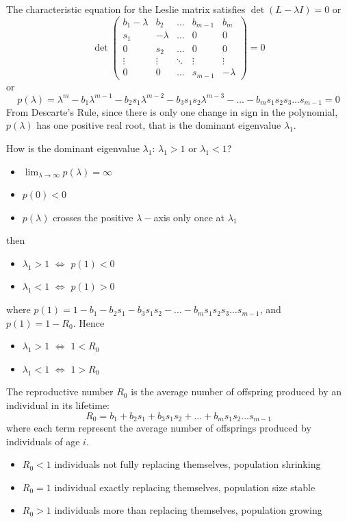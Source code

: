 The characteristic equation for the Leslie matrix satisfies $\det(L-\lambda I)=0$ or
$$\det 
\left(
\begin{array}{ccccc}
b_1-\lambda & b_2 & \hdots & b_{m-1} & b_m\\
s_1 & -\lambda  & \hdots & 0 & 0\\
0 & s_2  & \hdots & 0 & 0\\
\vdots & \vdots & \ddots & \vdots & \vdots \\
0 &0 &\hdots & s_{m-1} &-\lambda
\end{array}
\right)=0$$
or
$$p(\lambda)=\lambda ^m-b_1 \lambda^{m-1}-b_2s_1 \lambda^{m-2}- b_3s_1 s_2 \lambda^{m-3}-\dots - b_m s_1s_2 s_3\dots s_{m-1}=0 $$
From Descarte's Rule, since there is only one change in sign in the polynomial, $p(\lambda)$ has one positive real root, that is the dominant eigenvalue $\lambda _1$.

How is the dominant eigenvalue $\lambda _1$: $\lambda _1 >1$ or $\lambda _1 <1$?
\begin{itemize}
\item $\lim _{\lambda \rightarrow \infty}p(\lambda)=\infty$
\item $p(0)<0$
\item $p(\lambda)$ crosses the positive $\lambda-$axis only once at $\lambda_1$
\end{itemize}
then 
\begin{itemize}
\item $\lambda _1 >1$ $\Leftrightarrow$ $p(1)<0$
\item $\lambda _1 <1$ $\Leftrightarrow$ $p(1)>0$
\end{itemize}
where $p(1)=1-b_1 -b_2s_1 - b_3s_1 s_2 -\dots - b_m s_1s_2 s_3\dots s_{m-1}$, and $p(1)=1-R_0$.
Hence
\begin{itemize}
\item $\lambda _1 >1$ $\Leftrightarrow$ $1<R_0$
\item $\lambda _1 <1$ $\Leftrightarrow$ $1>R_0$
\end{itemize}

\begin{definition}
The reproductive number $R_0$ is the average number of offspring produced by an
individual in its lifetime:
$$R_0=b_1+b_2s_1+b_3s_1s_2+\dots+b_ms_1s_2\dots s_{m-1}$$
where each term represent the average
number of offsprings produced by individuals of age $i$.
\begin{itemize}
\item $R_0 < 1$ individuals not fully replacing themselves, population shrinking
\item $R_0 = 1$ individual exactly replacing themselves, population size stable
\item $R_0 > 1$ individuals more than replacing themselves, population growing
\end{itemize}
\end{definition}



